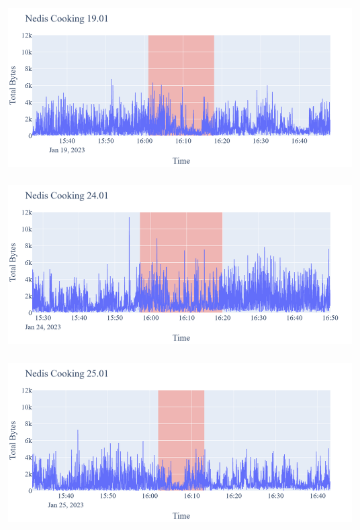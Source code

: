 \begin{figure}[H]
\begin{subfigure}[b]{0.5\textwidth}
    \end{subfigure}
    \begin{subfigure}[b]{0.5\textwidth}
        \centering
        \includegraphics[width=1.2\hsize]{figures/Nedis_Cooking_Bytes_19.01.png}
    \end{subfigure}
    \begin{subfigure}[b]{0.5\textwidth}
        \centering
        \includegraphics[width=1.2\hsize]{figures/Nedis_Cooking_Bytes_24.01.png}
    \end{subfigure}
    \begin{subfigure}[b]{0.5\textwidth}
        \centering
        \includegraphics[width=1.2\hsize]{figures/Nedis_Cooking_Bytes_25.01.png}
    \end{subfigure}
    \begin{subfigure}[b]{0.5\textwidth}

\end{subfigure}
\end{figure}
